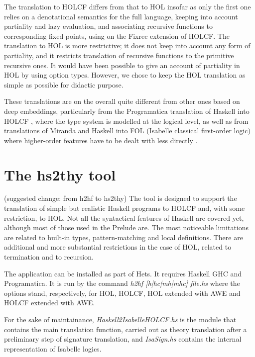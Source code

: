 \documentclass[a4paper,12pt]{article}
\begin{document}
The translation to HOLCF differs from that to HOL insofar as only the
first one relies on a denotational semantics for the full language,
keeping into account partiality and lazy evaluation, and associating
recursive functions to corresponding fixed points, using on the Fixrec
extension of HOLCF. The translation to HOL is more restrictive; it
does not keep into account any form of partiality, and it restricts
translation of recursive functions to the primitive recursive ones.
It would have been possible to give an account of partiality in HOL by
using option types. However, we chose to keep the HOL translation as
simple as possible for didactic purpose.

These translations are on the overall quite different from other ones
based on deep embeddings, particularly from the Programatica
translation of Haskell into HOLCF \cite{Huff}, where the type system
is modelled at the logical level, as well as from translations of
Miranda and Haskell into FOL (Isabelle classical first-order logic)
where higher-order features have to be dealt with less directly
\cite{Thompson95,Thompson92}.



\section*{The hs2thy tool}

(suggested change: from h2hf to hs2thy)
The tool is designed to support the translation of simple but
realistic Haskell programs to HOLCF and, with some restriction, to
HOL.  Not all the syntactical features of Haskell are covered yet,
although most of those used in the Prelude are. The most noticeable
limitations are related to built-in types, pattern-matching and local
definitions.  There are additional and more substantial restrictions
in the case of HOL, related to termination and to recursion.

The application can be installed as part of Hets. It requires Haskell
GHC and Programatica. It is run by the command \emph{h2hf
  [h|hc|mh|mhc] file.hs} where the options stand, respectively, for
HOL, HOLCF, HOL extended with AWE and HOLCF extended with AWE.

For the sake of maintainance, \emph{Haskell2IsabelleHOLCF.hs} is the
module that contains the main translation function, carried out as
theory translation after a preliminary step of signature translation,
and \emph{IsaSign.hs} contains the internal representation of Isabelle
logics.
\end{document}
